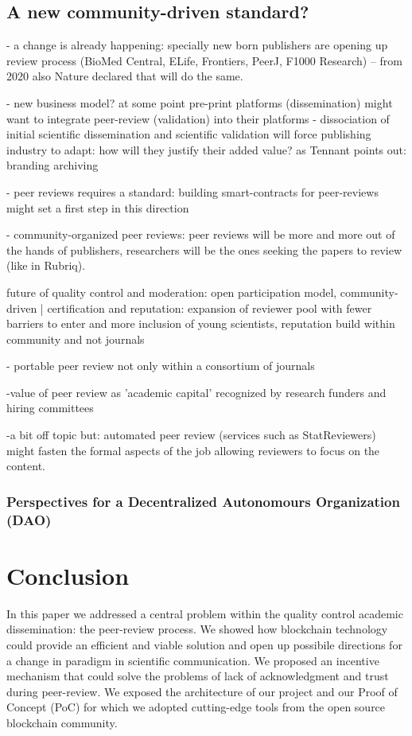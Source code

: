 \documentclass[runningheads]{llncs}
\begin{document}
\subsection{A new community-driven standard?}
- a change is already happening: specially new born publishers are opening up review process (BioMed Central, ELife, Frontiers, PeerJ, F1000 Research) -- from 2020 also Nature declared that will do the same.

- new business model? at some point pre-print platforms (dissemination) might want to integrate peer-review (validation) into their platforms - dissociation of initial scientific dissemination and scientific validation will force publishing industry to adapt: how will they justify their added value? as Tennant points out: branding archiving

- peer reviews requires a standard: building smart-contracts for peer-reviews might set a first step in this direction

- community-organized peer  reviews: peer reviews will be more and more out of the hands of publishers, researchers will be the ones seeking the papers to review (like in Rubriq).

future of quality control and moderation: open participation model, community-driven | certification and reputation: expansion of reviewer pool with fewer barriers to enter and more inclusion of young scientists, reputation build within community and not journals

- portable peer review not only within a consortium of journals

-value of peer review as 'academic capital' recognized by research funders and hiring committees

-a bit off topic but: automated peer review (services such as StatReviewers) might fasten the formal aspects of the job allowing reviewers to focus on the content.

\subsubsection{Perspectives for a Decentralized Autonomours Organization (DAO)}

\section{Conclusion}
In this paper we addressed a central problem within the quality control academic dissemination: the peer-review process. We showed how blockchain technology could provide an efficient and viable solution and open up possibile directions for a change in paradigm in scientific communication. We proposed an incentive mechanism that could solve the problems of lack of acknowledgment and trust during peer-review. We exposed the architecture of our project and our Proof of Concept (PoC) for which we adopted cutting-edge tools from the open source blockchain community.
\end{document}

